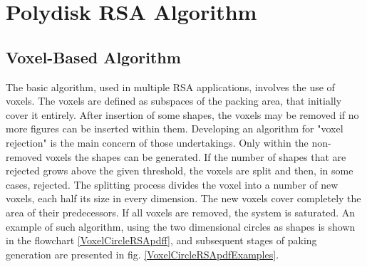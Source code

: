 \documentclass[12pt, oneside]{report}
\begin{document}

\chapter{Polydisk RSA Algorithm}

\section {Voxel-Based Algorithm}

The basic algorithm, used in multiple RSA applications, involves the use of voxels. The voxels are defined as subspaces of the packing area, that initially cover it entirely. After insertion of some shapes, the voxels may be removed if no more figures can be inserted within them. Developing an algorithm for "voxel rejection" is the main concern of those undertakings. Only within the non-removed voxels the shapes can be generated. If the number of shapes that are rejected grows above the given threshold, the voxels are split and then, in some cases, rejected. The splitting process divides the voxel into a number of new voxels, each half its size in every dimension. The new voxels cover completely the area of their predecessors. If all voxels are removed, the system is saturated. An example of such algorithm, using the two dimensional circles as shapes is shown in the flowchart \ref{VoxelCircleRSApdff}, and subsequent stages of paking generation are presented in fig. \ref{VoxelCircleRSApdfExamples}.
\end{document}
